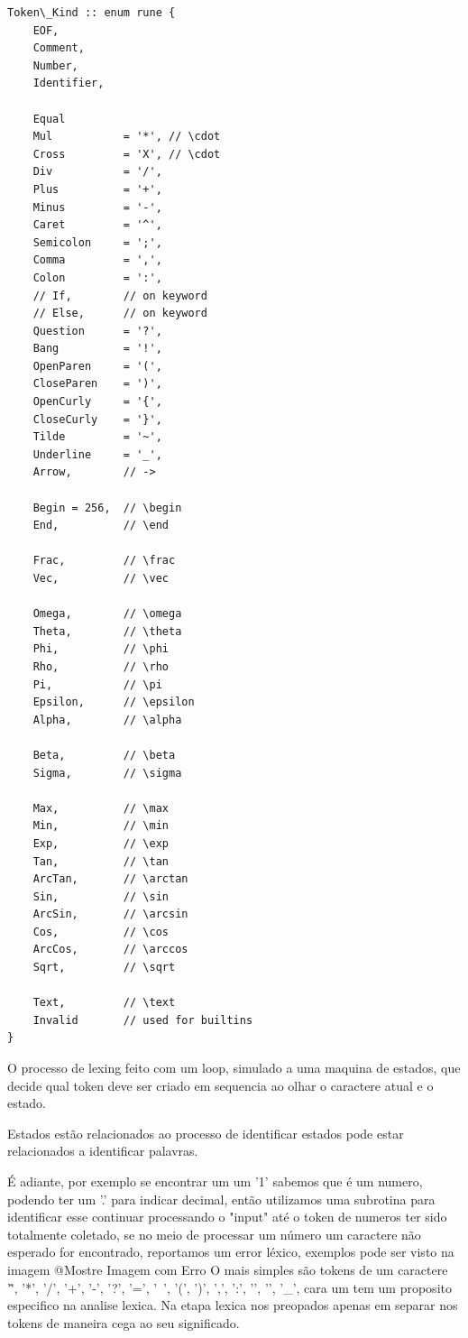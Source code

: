 \begin{codigo}[H]
  \caption{\small } \label{}
\begin{lstlisting}
Token\_Kind :: enum rune {
    EOF,
    Comment,
    Number,
    Identifier,

    Equal
    Mul           = '*', // \cdot
    Cross         = 'X', // \cdot
    Div           = '/',
    Plus          = '+',
    Minus         = '-',
    Caret         = '^',
    Semicolon     = ';',
    Comma         = ',',
    Colon         = ':',
    // If,        // on keyword
    // Else,      // on keyword
    Question      = '?',
    Bang          = '!',
    OpenParen     = '(',
    CloseParen    = ')',
    OpenCurly     = '{',
    CloseCurly    = '}',
    Tilde         = '~',
    Underline     = '_',
    Arrow,        // ->

    Begin = 256,  // \begin
    End,          // \end

    Frac,         // \frac
    Vec,          // \vec

    Omega,        // \omega
    Theta,        // \theta
    Phi,          // \phi
    Rho,          // \rho
    Pi,           // \pi
    Epsilon,      // \epsilon
    Alpha,        // \alpha

    Beta,         // \beta
    Sigma,        // \sigma

    Max,          // \max
    Min,          // \min
    Exp,          // \exp
    Tan,          // \tan
    ArcTan,       // \arctan
    Sin,          // \sin
    ArcSin,       // \arcsin
    Cos,          // \cos
    ArcCos,       // \arccos
    Sqrt,         // \sqrt

    Text,         // \text
    Invalid       // used for builtins
}
\end{lstlisting}
\end{codigo}

O processo de lexing feito com um loop, simulado a uma maquina de estados, que decide qual token deve ser criado em sequencia ao olhar o caractere atual e o estado.

Estados estão relacionados ao processo de identificar estados pode estar relacionados a identificar palavras.

É  adiante, por exemplo se encontrar um um '1' sabemos que é um numero, podendo ter um '.' para indicar decimal, então utilizamos 
uma subrotina para identificar esse continuar processando o "input" até o token de numeros ter sido totalmente coletado, se no meio de processar um número um caractere não esperado for encontrado, reportamos um error léxico, exemplos pode ser visto na imagem @{Mostre Imagem com Erro}
O mais simples são tokens de um caractere '\^', '*', '/', '+', '-', '?', '=', '~', '(', ')', ',', ':', '{', '}', '\_', cara um tem um proposito especifico na analise lexica. Na etapa lexica nos preopados apenas em separar nos tokens de maneira cega ao seu significado.


